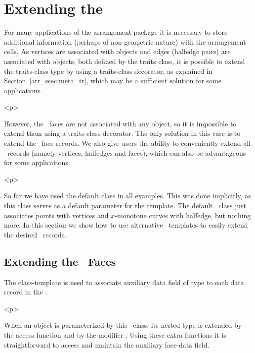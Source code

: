 \section{Extending the \dcel}
\label{arr_sec:ex_dcel}
%
For many applications of the arrangement package it is necessary to
store additional information (perhaps of non-geometric nature) with
the arrangement cells. As vertices are associated with 
objects and edges (halfedge pairs) are associated with
 objects, both defined by the traits class,
it is possible to extend the traits-class type by using a traits-class
decorator, as explained in Section~\ref{arr_ssec:meta_tr}, which may
be a sufficient solution for some applications.

\begin{ccHtmlOnly}<p>\end{ccHtmlOnly}
However, the \dcel\ faces are not associated with any object, so it
is impossible to extend them using a traits-class decorator. The only
solution in this case is to extend the \dcel\ face records. We also
give users the ability to conveniently extend all \dcel\ records
(namely vertices, halfedges and faces), which can also be advantageous
for some applications.

\begin{ccHtmlOnly}<p>\end{ccHtmlOnly}
So far we have used the default  class
in all examples. This was done implicitly, as this class serves as
a default parameter for the  template. The default
\dcel\ class just associates points with vertices and $x$-monotone
curves with halfedge, but nothing more. In this section we show
how to use alternative \dcel\ templates to easily extend the desired
\dcel\ records.

\subsection{Extending the \dcel\ Faces}
\label{arr_ssec:ex_dcel_face}
%
The  class-template
is used to associate auxiliary data field of type  to
each data record in the \dcel.

\begin{ccHtmlOnly}<p>\end{ccHtmlOnly}
When an  object is parameterized by this 
\dcel\ class, its nested  type is extended by the access function
 and by the modifier . Using these extra
functions it is straightforward to access and maintain the auxiliary
face-data field.

